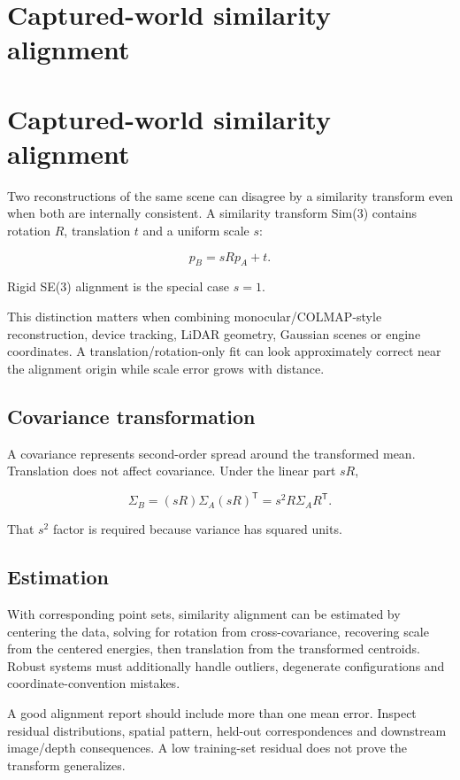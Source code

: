 \hypertarget{appendix-5f40b4fea463}{}
\section*{Captured-world similarity alignment}
\section{Captured-world similarity alignment}\label{captured-world-similarity-alignment}

Two reconstructions of the same scene can disagree by a similarity transform even when both are internally consistent. A similarity transform Sim(3) contains rotation \(R\), translation \(t\) and a uniform scale \(s\):

\[
p_B = sRp_A+t.
\]

Rigid SE(3) alignment is the special case \(s=1\).

This distinction matters when combining monocular/COLMAP-style reconstruction, device tracking, LiDAR geometry, Gaussian scenes or engine coordinates. A translation/rotation-only fit can look approximately correct near the alignment origin while scale error grows with distance.

\subsection{Covariance transformation}\label{covariance-transformation}

A covariance represents second-order spread around the transformed mean. Translation does not affect covariance. Under the linear part \(sR\),

\[
\Sigma_B
=
(sR)\Sigma_A(sR)^{\mathsf T}
=
s^2 R\Sigma_A R^{\mathsf T}.
\]

That \(s^2\) factor is required because variance has squared units.

\subsection{Estimation}\label{estimation}

With corresponding point sets, similarity alignment can be estimated by centering the data, solving for rotation from cross-covariance, recovering scale from the centered energies, then translation from the transformed centroids. Robust systems must additionally handle outliers, degenerate configurations and coordinate-convention mistakes.

A good alignment report should include more than one mean error. Inspect residual distributions, spatial pattern, held-out correspondences and downstream image/depth consequences. A low training-set residual does not prove the transform generalizes.

